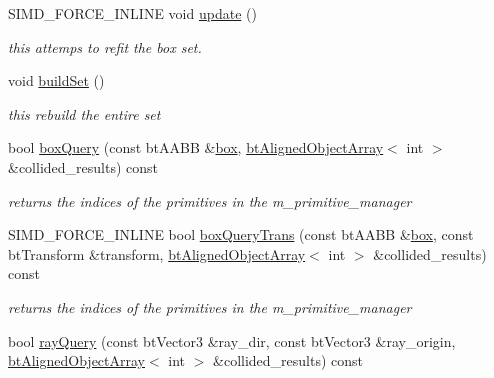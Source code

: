 \begin{DoxyCompactItemize}
\item 
S\+I\+M\+D\+\_\+\+F\+O\+R\+C\+E\+\_\+\+I\+N\+L\+I\+N\+E void \hyperlink{classbt_g_impact_quantized_bvh_a71665f5245b8f7de1c54f107ef262cd0}{update} ()
\begin{DoxyCompactList}\small\item\em this attemps to refit the box set. \end{DoxyCompactList}\item 
\hypertarget{classbt_g_impact_quantized_bvh_a2f061fbf0c6d8a81438861be4add7968}{void \hyperlink{classbt_g_impact_quantized_bvh_a2f061fbf0c6d8a81438861be4add7968}{build\+Set} ()}\label{classbt_g_impact_quantized_bvh_a2f061fbf0c6d8a81438861be4add7968}

\begin{DoxyCompactList}\small\item\em this rebuild the entire set \end{DoxyCompactList}\item 
\hypertarget{classbt_g_impact_quantized_bvh_ab265ffaec21d729bb4d148e843de938c}{bool \hyperlink{classbt_g_impact_quantized_bvh_ab265ffaec21d729bb4d148e843de938c}{box\+Query} (const bt\+A\+A\+B\+B \&\hyperlink{structbox}{box}, \hyperlink{classbt_aligned_object_array}{bt\+Aligned\+Object\+Array}$<$ int $>$ \&collided\+\_\+results) const }\label{classbt_g_impact_quantized_bvh_ab265ffaec21d729bb4d148e843de938c}

\begin{DoxyCompactList}\small\item\em returns the indices of the primitives in the m\+\_\+primitive\+\_\+manager \end{DoxyCompactList}\item 
\hypertarget{classbt_g_impact_quantized_bvh_a7ba1ab66201f211706f1605581a004a4}{S\+I\+M\+D\+\_\+\+F\+O\+R\+C\+E\+\_\+\+I\+N\+L\+I\+N\+E bool \hyperlink{classbt_g_impact_quantized_bvh_a7ba1ab66201f211706f1605581a004a4}{box\+Query\+Trans} (const bt\+A\+A\+B\+B \&\hyperlink{structbox}{box}, const bt\+Transform \&transform, \hyperlink{classbt_aligned_object_array}{bt\+Aligned\+Object\+Array}$<$ int $>$ \&collided\+\_\+results) const }\label{classbt_g_impact_quantized_bvh_a7ba1ab66201f211706f1605581a004a4}

\begin{DoxyCompactList}\small\item\em returns the indices of the primitives in the m\+\_\+primitive\+\_\+manager \end{DoxyCompactList}\item 
\hypertarget{classbt_g_impact_quantized_bvh_a284ae5b0d5e813bb0bcc02d76cff8b1b}{bool \hyperlink{classbt_g_impact_quantized_bvh_a284ae5b0d5e813bb0bcc02d76cff8b1b}{ray\+Query} (const bt\+Vector3 \&ray\+\_\+dir, const bt\+Vector3 \&ray\+\_\+origin, \hyperlink{classbt_aligned_object_array}{bt\+Aligned\+Object\+Array}$<$ int $>$ \&collided\+\_\+results) const }\label{classbt_g_impact_quantized_bvh_a284ae5b0d5e813bb0bcc02d76cff8b1b}


\end{DoxyCompactItemize}
